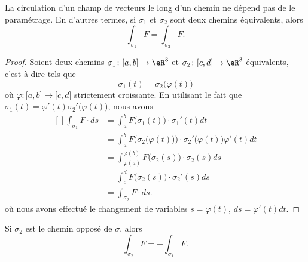 \begin{proposition}
	La circulation d'un champ de vecteurs le long d'un chemin ne dépend pas de le paramétrage. En d'autres termes, si $\sigma_1$ et $\sigma_2$ sont deux chemins équivalents, alors
	\begin{equation}
		\int_{\sigma_1}F=\int_{\sigma_2}F.
	\end{equation}
\end{proposition}

\begin{proof}
	Soient deux chemins $\sigma_1\colon \mathopen[ a , b \mathclose]\to \eR^3$ et $\sigma_2\colon \mathopen[ c , d \mathclose]\to \eR^3$ équivalents, c'est-à-dire tels que
	\begin{equation}
		\sigma_1(t)=\sigma_2\big( \varphi(t) \big)
	\end{equation}
	où $\varphi\colon \mathopen[ a , b \mathclose]\to \mathopen[ c , d \mathclose]$ strictement croissante. En utilisant le fait que $\sigma_1(t)=\varphi'(t)\sigma_2'\big( \varphi(t) \big)$, nous avons
	\begin{equation}
		\begin{aligned}[]
			\int_{\sigma_1}F\cdot ds & =\int_a^bF\big( \sigma_1(t) \big)\cdot\sigma_1'(t)dt                                                  \\
			                         & =\int_a^bF\Big( \sigma_2\big( \varphi(t) \big) \Big)\cdot\sigma_2'\big( \varphi(t) \big)\varphi'(t)dt \\
			                         & =\int_{\varphi(a)}^{\varphi(b)}F\big( \sigma_2(s) \big)\cdot\sigma_2(s)ds                             \\
			                         & =\int_c^dF\big( \sigma_2(s) \big)\cdot \sigma_2'(s)ds                                                 \\
			                         & =\int_{\sigma_2}F\cdot ds.
		\end{aligned}
	\end{equation}
	où nous avons effectué le changement de variables $s=\varphi(t)$, $ds=\varphi'(t)dt$.
\end{proof}

\begin{remark}
	Si $\sigma_2$ est le chemin opposé de $\sigma$, alors
	\begin{equation}
		\int_{\sigma_2}F=-\int_{\sigma_1}F.
	\end{equation}
\end{remark}

